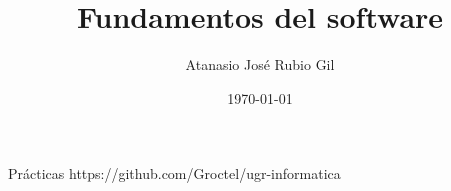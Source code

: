 \documentclass[10pt]{report}
\author{Atanasio José Rubio Gil}
\title{Fundamentos del software}
\date{\today}
\begin{document}
            {Prácticas}
            {https://github.com/Groctel/ugr-informatica}
\tableofcontents

\setcounter{chapter}{-1}

 \pagebreak

\end{document}
